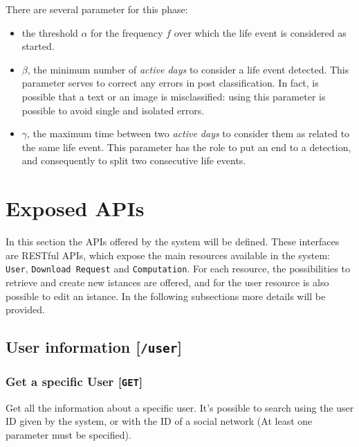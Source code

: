 There are several parameter for this phase: 
\begin{itemize}
\item the threshold $\alpha$ for the frequency $f$ over which the life event is considered as started.
\item $\beta$, the minimum number of \textit{active days} to consider a life event detected. This parameter serves to correct any errors in post classification. In fact, is possible that a text or an image is misclassified: using this parameter is possible to avoid single and isolated errors.
\item $\gamma$, the maximum time between two \textit{active days} to consider them as related to the same life event. This parameter has the role to put an end to a detection, and consequently to split two consecutive life events.
\end{itemize}

\section{Exposed APIs}
\label{sec:APIs}

In this section the APIs offered by the system will be defined. These interfaces are RESTful APIs, which expose the main resources available in the system: \texttt{User}, \texttt{Download Request} and \texttt{Computation}. For each resource, the possibilities to retrieve and create new istances are offered, and for the user resource is also possible to edit an istance. In the following subsections more details will be provided. 

\subsection{User information {[}\protect\texttt{/user}{]}}
\label{sec:APIuser}

\subsubsection{Get a specific User {[}\protect\texttt{GET}{]}}

Get all the information about a specific user. It's possible to search using the user ID given by the system, or with the ID of a social network (At least one parameter must be specified).

